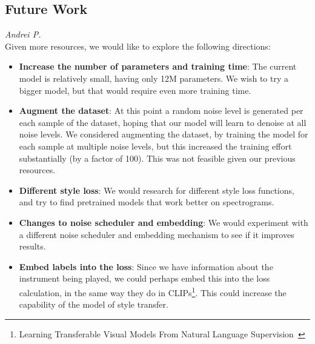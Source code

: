 \subsection{Future Work}
\textit{Andrei P.}\\
Given more resources, we would like to explore the following directions:
\begin{itemize}
    \item \textbf{Increase the number of parameters and training time}: The current model is relatively small, having only 12M parameters. We wish to try a bigger model, but that would require even more training time.
    \item \textbf{Augment the dataset}: At this point a random noise level is generated per each sample of the dataset, hoping that our model will learn to denoise at all noise levels. We considered augmenting the dataset, by training the model for each sample at multiple noise levels, but this increased the training effort substantially (by a factor of 100). This was not feasible given our previous resources.
    \item \textbf{Different style loss}: We would research for different style loss functions, and try to find pretrained models that work better on spectrograms.
    \item \textbf{Changes to noise scheduler and embedding}: We would experiment with a different noise scheduler and embedding mechanism to see if it improves results.
    \item \textbf{Embed labels into the loss}: Since we have information about the instrument being played, we could perhaps embed this into the loss calculation, in the same way they do in CLIPs\footnote{Learning Transferable Visual Models From Natural Language Supervision~\cite{radford2021learning}}. This could increase the capability of the model of style transfer.
\end{itemize}

